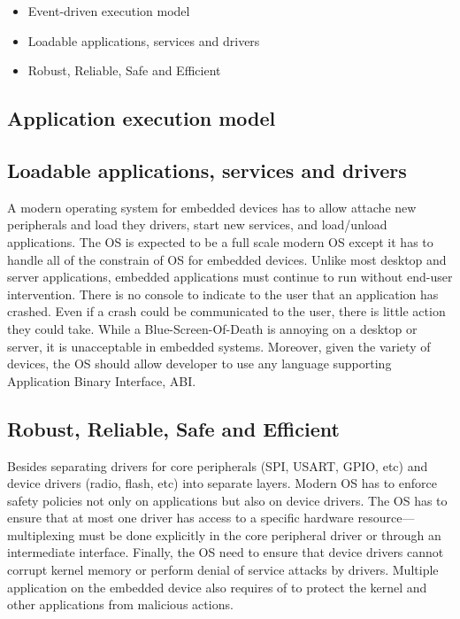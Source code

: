 \begin{itemize}
  \item Event-driven execution model
  \item Loadable applications, services and drivers
  \item Robust, Reliable, Safe and Efficient 
\end{itemize}



\subsection{Application execution model}


\subsection{Loadable applications, services and drivers}
A modern operating system for embedded devices has to allow attache new
peripherals and load they drivers, start new services, and load/unload
applications. The OS is expected to be a full scale modern OS except it has to
handle all of the constrain of OS for embedded devices. Unlike most desktop and
server applications, embedded applications must continue to run without end-user
intervention. There is no console to indicate to the user that an application
has crashed. Even if a crash could be communicated to the user, there is little
action they could take. While a Blue-Screen-Of-Death is annoying on a desktop or
server, it is unacceptable in embedded systems. Moreover, given the variety of
devices, the OS should allow developer to use any language supporting
Application Binary Interface, ABI.

\subsection{Robust, Reliable, Safe and Efficient}
Besides separating drivers for core peripherals (SPI, USART, GPIO, etc) and
device drivers (radio, flash, etc) into separate layers. Modern OS has to
enforce safety policies not only on applications but also on device drivers. The
OS has to ensure that at most one driver has access to a specific hardware
 resource---multiplexing must be done explicitly in the core peripheral driver
 or through an intermediate interface. Finally, the OS need to ensure that
 device drivers cannot corrupt kernel memory or perform denial of service
 attacks by drivers. Multiple application on the embedded device also requires
 of to protect the kernel and other applications from malicious actions.

